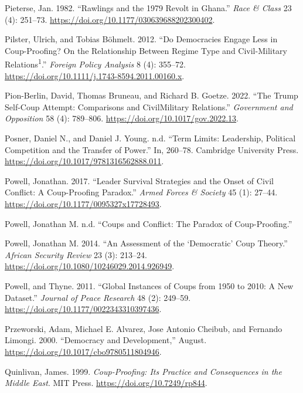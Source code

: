 \documentclass[
  12pt,
]{report}
\newlength{\cslhangindent}
\newenvironment{CSLReferences}[2] %
 {\begin{list}{}{%
  \setlength{\itemindent}{0pt}
  \setlength{\leftmargin}{0pt}
  \setlength{\parsep}{0pt}
  \ifodd #1
   \setlength{\leftmargin}{\cslhangindent}
   \setlength{\itemindent}{-1\cslhangindent}
  \fi
  \setlength{\itemsep}{#2\baselineskip}}}
 {\end{list}}
\begin{document}
\begin{CSLReferences}{1}{0}
Pieterse, Jan. 1982. {``Rawlings and the 1979 Revolt in Ghana.''}
\emph{Race \& Class} 23 (4): 251--73.
\url{https://doi.org/10.1177/030639688202300402}.

Pilster, Ulrich, and Tobias Böhmelt. 2012. {``Do Democracies Engage Less
in Coup-Proofing? On the Relationship Between Regime Type and
Civil-Military Relations{\textsuperscript{1}}.''} \emph{Foreign Policy
Analysis} 8 (4): 355--72.
\url{https://doi.org/10.1111/j.1743-8594.2011.00160.x}.

Pion-Berlin, David, Thomas Bruneau, and Richard B. Goetze. 2022. {``The
Trump Self-Coup Attempt: Comparisons and Civil{\textendash}Military
Relations.''} \emph{Government and Opposition} 58 (4): 789--806.
\url{https://doi.org/10.1017/gov.2022.13}.

Posner, Daniel N., and Daniel J. Young. n.d. {``Term Limits: Leadership,
Political Competition and the Transfer of Power.''} In, 260--78.
Cambridge University Press.
\url{https://doi.org/10.1017/9781316562888.011}.

Powell, Jonathan. 2017. {``Leader Survival Strategies and the Onset of
Civil Conflict: A Coup-Proofing Paradox.''} \emph{Armed Forces \&
Society} 45 (1): 27--44. \url{https://doi.org/10.1177/0095327x17728493}.

Powell, Jonathan M. n.d. {``Coups and Conflict: The Paradox of
Coup-Proofing.''}

Powell, Jonathan M. 2014. {``An Assessment of the {`}Democratic{'} Coup
Theory.''} \emph{African Security Review} 23 (3): 213--24.
\url{https://doi.org/10.1080/10246029.2014.926949}.

Powell, and Thyne. 2011. {``Global Instances of Coups from 1950 to 2010:
A New Dataset.''} \emph{Journal of Peace Research} 48 (2): 249--59.
\url{https://doi.org/10.1177/0022343310397436}.

Przeworski, Adam, Michael E. Alvarez, Jose Antonio Cheibub, and Fernando
Limongi. 2000. {``Democracy and Development,''} August.
\url{https://doi.org/10.1017/cbo9780511804946}.

Quinlivan, James. 1999. \emph{Coup-Proofing: Its Practice and
Consequences in the Middle East}. MIT Press.
\url{https://doi.org/10.7249/rp844}.


\end{CSLReferences}
\end{document}
